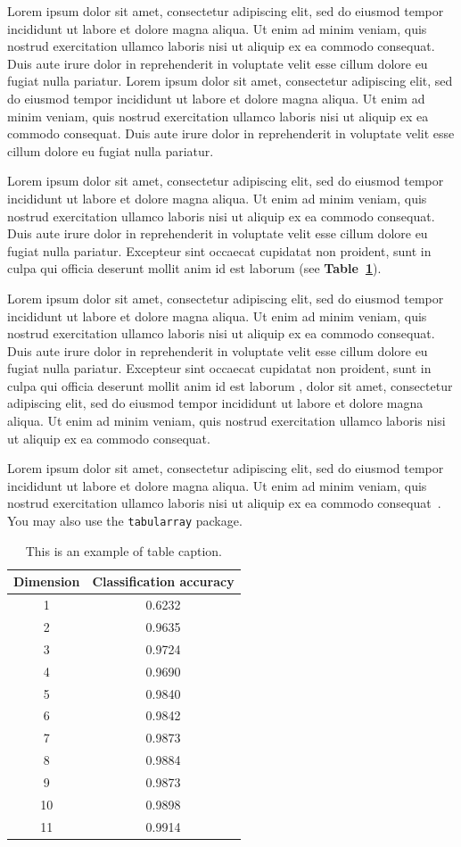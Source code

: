 \documentclass[english]{sbc2025}%
\begin{document}
Lorem ipsum dolor sit amet, consectetur adipiscing elit, sed do eiusmod tempor incididunt ut labore et dolore magna aliqua. Ut enim ad minim veniam, quis nostrud exercitation ullamco laboris nisi ut aliquip ex ea commodo consequat. Duis aute irure dolor in reprehenderit in voluptate velit esse cillum dolore eu fugiat nulla pariatur.  Lorem ipsum dolor sit amet, consectetur adipiscing elit, sed do eiusmod tempor incididunt ut labore et dolore magna aliqua. Ut enim ad minim veniam, quis nostrud exercitation ullamco laboris nisi ut aliquip ex ea commodo consequat. Duis aute irure dolor in reprehenderit in voluptate velit esse cillum dolore eu fugiat nulla pariatur. 

Lorem ipsum dolor sit amet, consectetur adipiscing elit, sed do eiusmod tempor incididunt ut labore et dolore magna aliqua. Ut enim ad minim veniam, quis nostrud exercitation ullamco laboris nisi ut aliquip ex ea commodo consequat. Duis aute irure dolor in reprehenderit in voluptate velit esse cillum dolore eu fugiat nulla pariatur. Excepteur sint occaecat cupidatat non proident, sunt in culpa qui officia deserunt mollit anim id est laborum (see \textbf{ Table~\ref{tab1}}).

Lorem ipsum dolor sit amet, consectetur adipiscing elit, sed do eiusmod tempor incididunt ut labore et dolore magna aliqua. Ut enim ad minim veniam, quis nostrud exercitation ullamco laboris nisi ut aliquip ex ea commodo consequat. Duis aute irure dolor in reprehenderit in voluptate velit esse cillum dolore eu fugiat nulla pariatur. Excepteur sint occaecat cupidatat non proident, sunt in culpa qui officia deserunt mollit anim id est laborum \citep{ref3}, dolor sit amet, consectetur adipiscing elit, sed do eiusmod tempor incididunt ut labore et dolore magna aliqua. Ut enim ad minim veniam, quis nostrud exercitation ullamco laboris nisi ut aliquip ex ea commodo consequat.

Lorem ipsum dolor sit amet, consectetur adipiscing elit, sed do eiusmod tempor incididunt ut labore et dolore magna aliqua. Ut enim ad minim veniam, quis nostrud exercitation ullamco laboris nisi ut aliquip ex ea commodo consequat~\citep{ref4}.
You may also use the \texttt{tabularray} package.

\begin{table}[!ht]
\caption{This is an example of table caption.}
\centering
\begin{tabular}{@{}cc@{}}
\hline\hline
Dimension & Classification accuracy \\
\hline%
 1  & 0.6232 \\
 2  & 0.9635 \\ 
 3  & 0.9724 \\ 
 4  & 0.9690 \\ 
 5  & 0.9840 \\ 
 6  & 0.9842 \\ 
 7  & 0.9873 \\ 
 8  & 0.9884 \\
 9  & 0.9873 \\ 
 10 & 0.9898 \\ 
 11 & 0.9914 \\
\hline\hline
\end{tabular}
\label{tab1}
\end{table}
\end{document}

